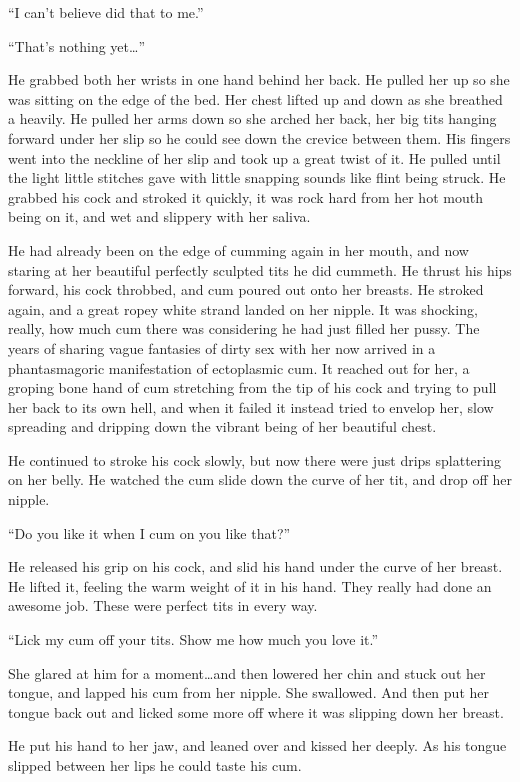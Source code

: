 \documentclass[letterpaper]{article}
\begin{document}
``I can't believe did that to me.''

``That's nothing yet\ldots''

He grabbed both her wrists in one hand behind her back.
He pulled her up so she was sitting on the edge of the bed. Her chest lifted up and down as she breathed a heavily.
He pulled her arms down so she arched her back, her big tits hanging forward under her slip so he could see down the crevice between them.
His fingers went into the neckline of her slip and took up a great twist of it. He pulled until the light little stitches gave with little snapping sounds like flint being struck.
He grabbed his cock and stroked it quickly, it was rock hard from her hot mouth being on it, and wet and slippery with her saliva.

He had already been on the edge of cumming again in her mouth, and now staring at her beautiful perfectly sculpted tits he did cummeth.
He thrust his hips forward, his cock throbbed, and cum poured out onto her breasts.
He stroked again, and a great ropey white strand landed on her nipple.
It was shocking, really, how much cum there was considering he had just filled her pussy.
The years of sharing vague fantasies of dirty sex with her now arrived in a phantasmagoric manifestation of ectoplasmic cum.
It reached out for her, a groping bone hand of cum stretching from the tip of his cock and trying to pull her back to its own hell, and when it failed it instead tried to envelop her, slow spreading and dripping down the vibrant being of her beautiful chest.

He continued to stroke his cock slowly, but now there were just drips splattering on her belly.
He watched the cum slide down the curve of her tit, and drop off her nipple.

``Do you like it when I cum on you like that?''

He released his grip on his cock, and slid his hand under the curve of her breast.
He lifted it, feeling the warm weight of it in his hand.
They really had done an awesome job. These were perfect tits in every way.

``Lick my cum off your tits. Show me how much you love it.''

She glared at him for a moment\ldots and then lowered her chin and stuck out her tongue, and lapped his cum from her nipple.
She swallowed.
And then put her tongue back out and licked some more off where it was slipping down her breast.

He put his hand to her jaw, and leaned over and kissed her deeply.
As his tongue slipped between her lips he could taste his cum.
\end{document}
